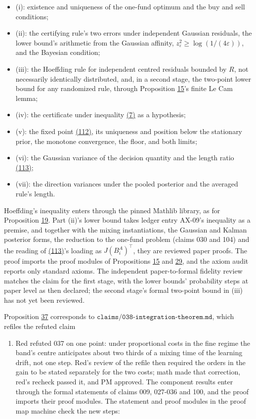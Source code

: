 \documentclass[11pt]{article}
\begin{document}
\begin{itemize}
  \item (i): existence and uniqueness of the one-fund optimum and the buy and
  sell conditions;
  \item (ii): the certifying rule's two errors under independent Gaussian
  residuals, the lower bound's arithmetic from the Gaussian affinity,
  \(z_\varepsilon^2\geq\log(1/(4\varepsilon))\), and the Bayesian condition;
  \item (iii): the Hoeffding rule for independent centred residuals bounded
  by \(R\), not necessarily identically distributed, and, in a second
  stage, the two-point lower bound for any randomized rule, through
  Proposition \hyperref[res:Proposition-15]{15}'s finite Le Cam lemma;
  \item (iv): the certificate under inequality \hyperref[eq:7]{(7)} as a hypothesis;
  \item (v): the fixed point \hyperref[eq:112]{(112)}, its uniqueness and position below the
  stationary prior, the monotone convergence, the floor, and both
  limits;
  \item (vi): the Gaussian variance of the decision quantity and the length
  ratio \hyperref[eq:113]{(113)};
  \item (vii): the direction variances under the pooled posterior and the
  averaged rule's length.
\end{itemize}

Hoeffding's inequality enters through the pinned Mathlib library, as
for Proposition \hyperref[res:Proposition-19]{19}. Part (ii)'s lower bound takes ledger entry AX-09's
inequality as a premise, and together with the mixing instantiations,
the Gaussian and Kalman posterior forms, the reduction to the one-fund
problem (claims 030 and 104) and the reading of \hyperref[eq:113]{(113)}'s loading as
\(J(B^A_i)^\top\), they are reviewed paper proofs. The proof imports
the proof modules of Propositions \hyperref[res:Proposition-15]{15} and \hyperref[res:Proposition-29]{29}, and the axiom audit
reports only standard axioms. The independent paper-to-formal fidelity
review matches the claim for the first stage, with the lower bounds'
probability steps at paper level as then declared; the second stage's
formal two-point bound in (iii) has not yet been reviewed.

Proposition \hyperref[res:Proposition-37]{37} corresponds to
\(\texttt{claims/038-integration-theorem.md}\), which refiles the refuted claim

\begin{enumerate}
  \item Red refuted 037 on one point: under proportional costs in the fine
regime the band's centre anticipates about two thirds of a mixing time
of the learning drift, not one step. Red's review of the refile then
required the orders in the gain to be stated separately for the two
costs; math made that correction, red's recheck passed it, and PM
approved. The component results enter through the formal statements of
claims 009, 027-036 and 100, and the proof imports their proof modules.
The statement and proof modules in the proof map machine check the new
steps:
\end{enumerate}
\end{document}
